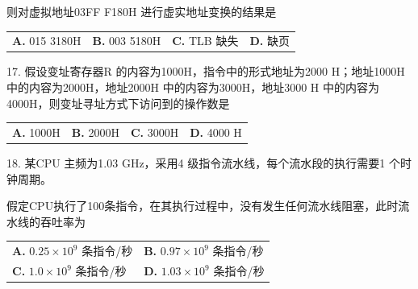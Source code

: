 \documentclass[UTF8,11pt]{ctexart}
\begin{document}
则对虚拟地址03FF F180H 进行虚实地址变换的结果是


\begin{center}\begin{tabular}{>{\raggedright\arraybackslash}p{\dimexpr(\linewidth-8\tabcolsep)/4\relax}>{\raggedright\arraybackslash}p{\dimexpr(\linewidth-8\tabcolsep)/4\relax}>{\raggedright\arraybackslash}p{\dimexpr(\linewidth-8\tabcolsep)/4\relax}>{\raggedright\arraybackslash}p{\dimexpr(\linewidth-8\tabcolsep)/4\relax}}
\textbf{A.} 015 3180H & \textbf{B.} 003 5180H & \textbf{C.} TLB 缺失 & \textbf{D.} 缺页\\[.35em]\end{tabular}\end{center}

17. 假设变址寄存器R 的内容为1000H，指令中的形式地址为2000 H；地址1000H 中的内容为2000H，地址2000H 中的内容为3000H，地址3000 H 中的内容为4000H，则变址寻址方式下访问到的操作数是


\begin{center}\begin{tabular}{>{\raggedright\arraybackslash}p{\dimexpr(\linewidth-8\tabcolsep)/4\relax}>{\raggedright\arraybackslash}p{\dimexpr(\linewidth-8\tabcolsep)/4\relax}>{\raggedright\arraybackslash}p{\dimexpr(\linewidth-8\tabcolsep)/4\relax}>{\raggedright\arraybackslash}p{\dimexpr(\linewidth-8\tabcolsep)/4\relax}}
\textbf{A.} 1000H & \textbf{B.} 2000H & \textbf{C.} 3000H & \textbf{D.} 4000 H\\[.35em]\end{tabular}\end{center}

18. 某CPU 主频为1.03 GHz，采用4 级指令流水线，每个流水段的执行需要1 个时钟周期。


假定CPU执行了100条指令，在其执行过程中，没有发生任何流水线阻塞，此时流水线的吞吐率为


\begin{center}\begin{tabular}{>{\raggedright\arraybackslash}p{\dimexpr(\linewidth-4\tabcolsep)/2\relax}>{\raggedright\arraybackslash}p{\dimexpr(\linewidth-4\tabcolsep)/2\relax}}
\textbf{A.} \(\displaystyle 0.25\times10^9\) 条指令/秒 & \textbf{B.} \(\displaystyle 0.97\times10^9\) 条指令/秒\\[.35em]
\textbf{C.} \(\displaystyle 1.0\times10^9\) 条指令/秒 & \textbf{D.} \(\displaystyle 1.03\times10^9\) 条指令/秒\\[.35em]\end{tabular}\end{center}
\end{document}
